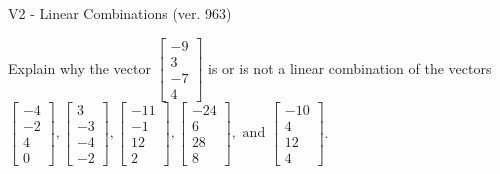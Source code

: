 \begin{exercise}
  \begin{exerciseTitle}V2 - Linear Combinations (ver. 963)\end{exerciseTitle}
  \begin{exerciseStatement}
    Explain why the vector \(\left[\begin{array}{c}
-9 \\
3 \\
-7 \\
4
\end{array}\right]\)  is or is not a linear 
	combination of the vectors \(\left[\begin{array}{c}
-4 \\
-2 \\
4 \\
0
\end{array}\right] , \left[\begin{array}{c}
3 \\
-3 \\
-4 \\
-2
\end{array}\right] , \left[\begin{array}{c}
-11 \\
-1 \\
12 \\
2
\end{array}\right] , \left[\begin{array}{c}
-24 \\
6 \\
28 \\
8
\end{array}\right] , \text{ and } \left[\begin{array}{c}
-10 \\
4 \\
12 \\
4
\end{array}\right]\).
	



\end{exerciseStatement}
\end{exercise}
